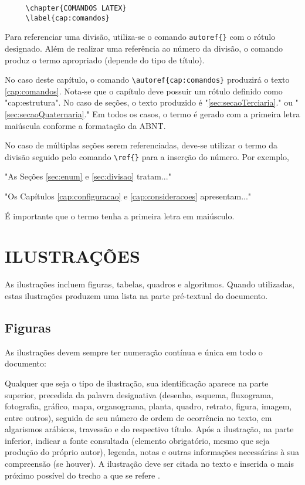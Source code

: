 \begin{verbatim}
     \chapter{COMANDOS LATEX}
     \label{cap:comandos}
\end{verbatim}

Para referenciar uma divisão, utiliza-se o comando \verb!autoref{}! com o rótulo designado. Além de realizar uma referência ao número da divisão, o comando produz o termo apropriado (depende do tipo de título). 

No caso deste capítulo, o comando \verb!\autoref{cap:comandos}! produzirá o texto \autoref{cap:comandos}. Nota-se que o capítulo deve possuir um rótulo definido como "cap:estrutura". No caso de seções, o texto produzido é "\autoref{sec:secaoTerciaria}." ou "\autoref{sec:secaoQuaternaria}." Em todos os casos, o termo é gerado com a primeira letra maiúscula conforme a formatação da  \ac{ABNT}. 

No caso de múltiplas seções serem referenciadas, deve-se utilizar o termo da divisão seguido pelo comando \verb!\ref{}! para a inserção do número. Por exemplo,

"As Seções \ref{sec:enum} e \ref{sec:divisao} tratam..." 

"Os Capítulos \ref{cap:configuracao} e \ref{cap:consideracoes} apresentam..."

É importante que o termo tenha a primeira letra em maiúsculo. 


\section{ILUSTRAÇÕES}

As ilustrações incluem figuras, tabelas, quadros e algoritmos. Quando utilizadas, estas ilustrações produzem uma lista na parte pré-textual do documento. 

\subsection{Figuras}

As ilustrações devem sempre ter numeração contínua e única em todo o documento:

\begin{citacao}
	Qualquer que seja o tipo de ilustração, sua identificação aparece na parte
	superior, precedida da palavra designativa (desenho, esquema, fluxograma,
	fotografia, gráfico, mapa, organograma, planta, quadro, retrato, figura,
	imagem, entre outros), seguida de seu número de ordem de ocorrência no texto,
	em algarismos arábicos, travessão e do respectivo título. Após a ilustração, na
	parte inferior, indicar a fonte consultada (elemento obrigatório, mesmo que
	seja produção do próprio autor), legenda, notas e outras informações
	necessárias à sua compreensão (se houver). A ilustração deve ser citada no
	texto e inserida o mais próximo possível do trecho a que se
	refere \cite{NBR14724:2011}.
\end{citacao}

